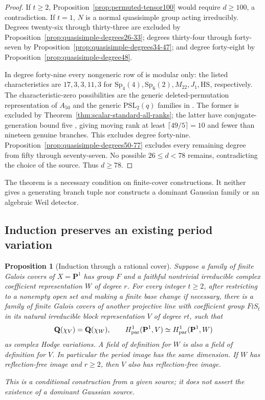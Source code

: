 \documentclass[11pt]{article}
\newtheorem{proposition}[theorem]{Proposition}
\theoremstyle{definition}
\theoremstyle{remark}
\newcommand{\Q}{\mathbf Q}
\begin{document}
\begin{proof}
If $t\geq2$, Proposition~\ref{prop:permuted-tensor100}
would require $d\geq100$, a contradiction. If $t=1$, $N$ is
a normal quasisimple group acting irreducibly. Degrees twenty-six
through thirty-three are excluded by
Proposition~\ref{prop:quasisimple-degrees26-33}; degrees thirty-four
through forty-seven by Proposition~\ref{prop:quasisimple-degrees34-47};
and degree forty-eight by Proposition~\ref{prop:quasisimple-degree48}.

In degree forty-nine every nongeneric row of
\cite[Table~2, p.~106]{HissMalleCorrection} is modular only:
the listed characteristics are $17,3,3,11,3$ for
$\mathrm{Sp}_4(4),\mathrm{Sp}_6(2),M_{22},J_1,\mathrm{HS}$,
respectively. The characteristic-zero possibilities are the
generic deleted-permutation representation of $A_{50}$ and the
generic $\mathrm{PSL}_2(q)$ families in
\cite[Table~2, p.~31]{HissMalle}. The former is excluded by
Theorem~\ref{thm:scalar-standard-all-ranks}; the latter have
conjugate-generation bound five \cite[Lemma~3.1]{GS}, giving
moving rank at least $\lceil49/5\rceil=10$ and fewer than
nineteen genuine branches. This excludes degree forty-nine.
Proposition~\ref{prop:quasisimple-degrees50-77} excludes every
remaining degree from fifty through seventy-seven. No possible
$26\leq d<78$ remains, contradicting the choice of the source.
Thus $d\geq78$.

\end{proof}

The theorem is a necessary condition on finite-cover
constructions.  It neither gives a generating branch tuple nor
constructs a dominant Gaussian family or an algebraic Weil
detector.


\subsection{Induction preserves an existing period variation}

\begin{proposition}[Induction through a rational cover]
\label{prop:wreath-inflation}
Suppose a family of finite Galois covers of $X=\mathbf P^1$
has group $F$ and a faithful nontrivial irreducible complex
coefficient representation $W$ of degree $r$.  For every integer
$t\geq2$, after restricting to a nonempty open set and making
a finite base change if necessary, there is a family of finite
Galois covers of another projective line with coefficient group
$F\wr S_t$ in its natural irreducible block representation $V$
of degree $rt$, such that
\[
 \Q(\chi_V)=\Q(\chi_W),\qquad
 H^1_{\rm par}(\mathbf P^1,V)
       \simeq H^1_{\rm par}(\mathbf P^1,W)
\]
as complex Hodge variations.  A field of definition for $W$ is
also a field of definition for $V$.  In particular the period
image has the same dimension.  If $W$ has reflection-free image
and $r\geq2$, then $V$ also has reflection-free image.

This is a conditional construction from a given source; it does
not assert the existence of a dominant Gaussian source.
\end{proposition}
\end{document}
